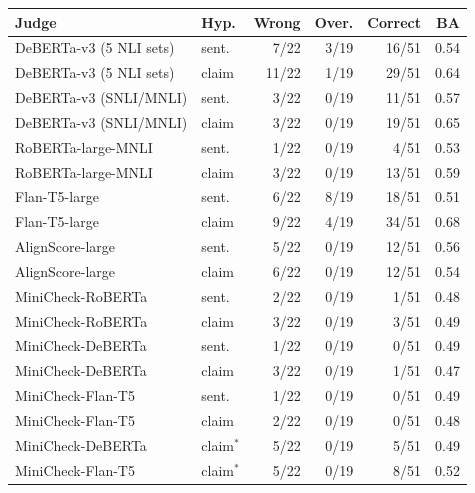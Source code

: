 \begin{tabular}{@{}llrrrr@{}}
\toprule
Judge & Hyp. & Wrong & Over. & Correct & BA \\
\midrule
DeBERTa-v3 (5 NLI sets) & sent. & 7/22 & 3/19 & 16/51 & 0.54 \\
DeBERTa-v3 (5 NLI sets) & claim & 11/22 & 1/19 & 29/51 & 0.64 \\
DeBERTa-v3 (SNLI/MNLI) & sent. & 3/22 & 0/19 & 11/51 & 0.57 \\
DeBERTa-v3 (SNLI/MNLI) & claim & 3/22 & 0/19 & 19/51 & 0.65 \\
RoBERTa-large-MNLI & sent. & 1/22 & 0/19 & 4/51 & 0.53 \\
RoBERTa-large-MNLI & claim & 3/22 & 0/19 & 13/51 & 0.59 \\
Flan-T5-large & sent. & 6/22 & 8/19 & 18/51 & 0.51 \\
Flan-T5-large & claim & 9/22 & 4/19 & 34/51 & 0.68 \\
AlignScore-large & sent. & 5/22 & 0/19 & 12/51 & 0.56 \\
AlignScore-large & claim & 6/22 & 0/19 & 12/51 & 0.54 \\
MiniCheck-RoBERTa & sent. & 2/22 & 0/19 & 1/51 & 0.48 \\
MiniCheck-RoBERTa & claim & 3/22 & 0/19 & 3/51 & 0.49 \\
MiniCheck-DeBERTa & sent. & 1/22 & 0/19 & 0/51 & 0.49 \\
MiniCheck-DeBERTa & claim & 3/22 & 0/19 & 1/51 & 0.47 \\
MiniCheck-Flan-T5 & sent. & 1/22 & 0/19 & 0/51 & 0.49 \\
MiniCheck-Flan-T5 & claim & 2/22 & 0/19 & 0/51 & 0.48 \\
MiniCheck-DeBERTa & claim$^*$ & 5/22 & 0/19 & 5/51 & 0.49 \\
MiniCheck-Flan-T5 & claim$^*$ & 5/22 & 0/19 & 8/51 & 0.52 \\
\bottomrule
\end{tabular}
